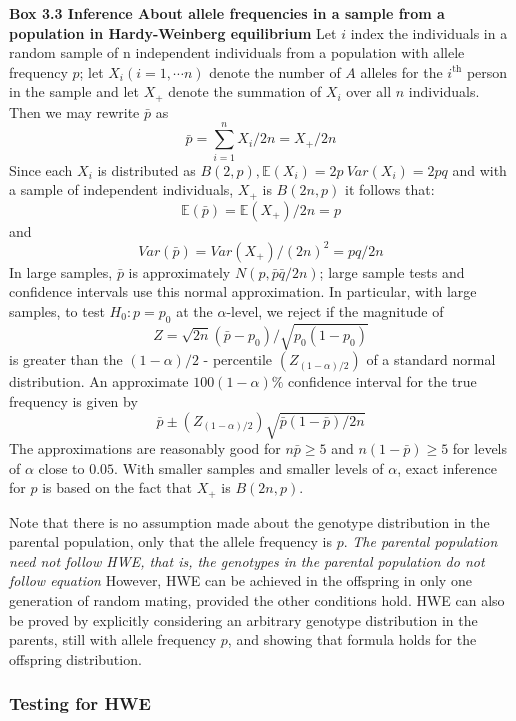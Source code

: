 \documentclass[a4paper,twoside,11pt]{article}
\begin{document}
\begin{shaded*}
\noindent \textbf{Box 3.3 Inference About allele frequencies in a sample from a population in Hardy-Weinberg equilibrium}
\newline
\newline
Let $i$ index the individuals in a random sample of n independent individuals from a population with allele frequency $p$; let $X_i(i=1,\cdots n)$ denote the number of $A$ alleles for the $i^{\text{th}}$ person in the sample and let $X_+$ denote the summation of $X_i$ over all $n$ individuals. Then we may rewrite $\bar{p}$ as
$$
\bar{p} = \sum^n_{i=1} X_i/2n = X_+ /2n
$$
Since each $X_i$ is distributed as $B(2,p), \mathbb{E}(X_i) = 2p \ Var(X_i) = 2pq$ and with a sample of independent individuals, $X_+$ is $B(2n,p)$ it follows that:
$$
\mathbb{E}(\bar{p}) = \mathbb{E}(X_+)/2n = p
$$
and
$$
Var(\bar{p}) = Var(X_+) /(2n)^2 = pq/2n
$$
In large samples, $\bar{p}$ is approximately $N(p, \bar{p}\bar{q}/2n)$; large sample tests and confidence intervals use this normal approximation. In particular, with large samples, to test $H_0: p=p_0$ at the $\alpha$-level, we reject if the magnitude of
$$
Z = \sqrt{2n}(\bar{p}-p_0)/\sqrt{p_0(1-p_0)}
$$
is greater than the $(1-\alpha)/2$ - percentile $(Z_{(1-\alpha)/2})$ of a standard normal distribution. An approximate $100(1-\alpha)\%$ confidence interval for the true frequency is given by
$$
\bar{p} \pm (Z_{(1-\alpha)/2}) \sqrt{\bar{p}(1-\bar{p})/2n}
$$
The approximations are reasonably good for $n\bar{p} \ge 5$ and $n(1-\bar{p})  \ge 5$ for levels of $\alpha$ close to $0.05$. With smaller samples and smaller levels of $\alpha$, exact inference for $p$ is based on the fact that $X_+$ is $B(2n, p)$.
\end{shaded*}
Note that there is no assumption made about the genotype distribution in the parental population, only that the allele frequency is $p$.
\newline
\newline
\textcolor{NavyBlue}{\textit{The parental population need not follow HWE, that is, the genotypes in the parental population do not follow equation}}
\newline
\newline
However, HWE can be achieved in the offspring in only one generation of random mating, provided the other conditions hold. HWE can also be proved by explicitly considering an arbitrary genotype distribution in the parents, still with allele frequency $p$, and showing that formula holds for the offspring distribution.
\subsubsection{Testing for HWE}
\end{document}
